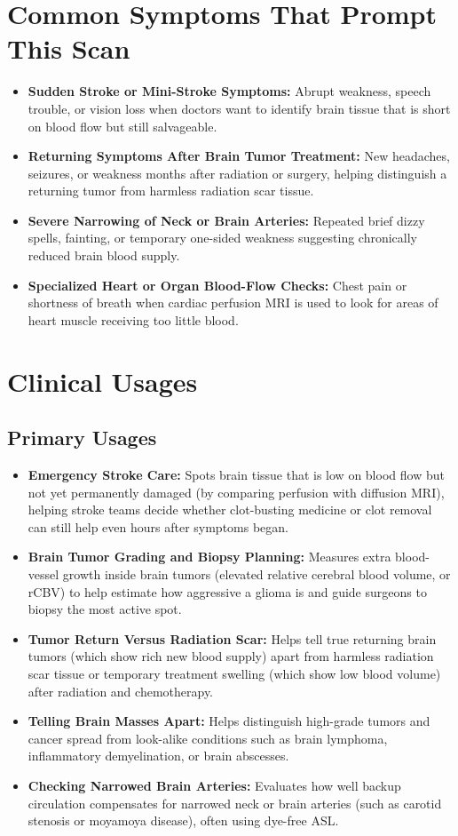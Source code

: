 \section{Common Symptoms That Prompt This Scan}
\begin{itemize}
    \item \textbf{Sudden Stroke or Mini-Stroke Symptoms:} Abrupt weakness, speech trouble, or vision loss when doctors want to identify brain tissue that is short on blood flow but still salvageable.
    \item \textbf{Returning Symptoms After Brain Tumor Treatment:} New headaches, seizures, or weakness months after radiation or surgery, helping distinguish a returning tumor from harmless radiation scar tissue.
    \item \textbf{Severe Narrowing of Neck or Brain Arteries:} Repeated brief dizzy spells, fainting, or temporary one-sided weakness suggesting chronically reduced brain blood supply.
    \item \textbf{Specialized Heart or Organ Blood-Flow Checks:} Chest pain or shortness of breath when cardiac perfusion MRI is used to look for areas of heart muscle receiving too little blood.
\end{itemize}

\section{Clinical Usages}

\subsection{Primary Usages}

\begin{itemize}
    \item \textbf{Emergency Stroke Care:} Spots brain tissue that is low on blood flow but not yet permanently damaged (by comparing perfusion with diffusion MRI), helping stroke teams decide whether clot-busting medicine or clot removal can still help even hours after symptoms began.
    \item \textbf{Brain Tumor Grading and Biopsy Planning:} Measures extra blood-vessel growth inside brain tumors (elevated relative cerebral blood volume, or rCBV) to help estimate how aggressive a glioma is and guide surgeons to biopsy the most active spot.
    \item \textbf{Tumor Return Versus Radiation Scar:} Helps tell true returning brain tumors (which show rich new blood supply) apart from harmless radiation scar tissue or temporary treatment swelling (which show low blood volume) after radiation and chemotherapy.
    \item \textbf{Telling Brain Masses Apart:} Helps distinguish high-grade tumors and cancer spread from look-alike conditions such as brain lymphoma, inflammatory demyelination, or brain abscesses.
    \item \textbf{Checking Narrowed Brain Arteries:} Evaluates how well backup circulation compensates for narrowed neck or brain arteries (such as carotid stenosis or moyamoya disease), often using dye-free ASL.
\end{itemize}

